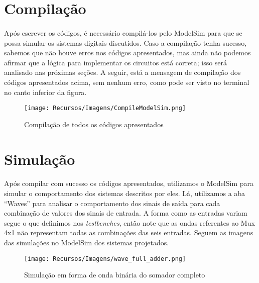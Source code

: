 \documentclass[a4paper,12pt]{article}
\begin{document}
\section{Compilação}
\paragraph{}
Após escrever os códigos, é necessário compilá-los pelo ModelSim para que se possa simular os sistemas digitais discutidos. Caso a compilação tenha sucesso, sabemos que não houve erros nos códigos apresentados, mas ainda não podemos afirmar que a lógica para implementar os circuitos está correta; isso será analisado nas próximas seções. A seguir, está a mensagem de compilação dos códigos apresentados acima, sem nenhum erro, como pode ser visto no terminal no canto inferior da figura.

\begin{figure}[H]
    \centering
    \texttt{[image: Recursos/Imagens/CompileModelSim.png]}
    \caption{Compilação de todos os códigos apresentados}
\end{figure}

\section{Simulação}
\paragraph{}
Após compilar com sucesso os códigos apresentados, utilizamos o ModelSim para simular o comportamento dos sistemas descritos por eles. Lá, utilizamos a aba ``Waves'' para analisar o comportamento dos sinais de saída para cada combinação de valores dos sinais de entrada. A forma como as entradas variam segue o que definimos nos \textit{testbenches}, então note que as ondas referentes ao Mux 4x1 não representam todas as combinações das seis entradas. Seguem as imagens das simulações no ModelSim dos sistemas projetados.

\begin{figure}[H]
    \centering
    \begin{tcolorbox}[colframe=cinza, colback=white, boxrule=0.75pt, arc=0pt, width=1\textwidth, center, boxsep=0pt, left=0pt, right=0pt, top=0pt, bottom=0pt]
    \texttt{[image: Recursos/Imagens/wave\_full\_adder.png]}
    \end{tcolorbox}
    \caption{Simulação em forma de onda binária do somador completo}
\end{figure}
\end{document}
